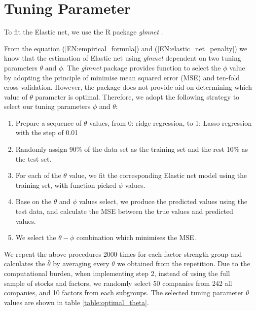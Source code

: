 \section{Tuning Parameter} \label{EN:parameter_tuning }
To fit the Elastic net, we use the R package \textit{glmnet} \cite{Friedman2010, Simon2011}.

From the equation (\ref{EN:empirical_formula}) and (\ref{EN:elastic_net_penalty}) we know that the estimation of Elastic net using \textit{glmnet} dependent on two tuning parameters $\theta$ and $\phi$.
The \textit{glmnet} package provides function to select the $\phi$ value by adopting the principle of minimise mean squared error (MSE) and ten-fold cross-validation.
However, the package does not provide aid on determining which value of $\theta$ parameter is optimal.
Therefore, we adopt the following strategy to select our tuning parameters $\phi$  and $\theta$:
\begin{enumerate}
\item Prepare a sequence of $\theta$ values, from 0: ridge regression, to 1: Lasso regression with the step of 0.01
\item Randomly assign 90\% of the data set as the training set and the rest 10\% as the test set. 
\item For each of the $\theta$ value, we fit the corresponding Elastic net model using the training set, with function picked $\phi$ values.
\item Base on the $\theta$ and $\phi$ values select, we produce the predicted values using the test data, and calculate the MSE between the true values and predicted values.
\item We select the $\theta - \phi$ combination which minimises the MSE.
\end{enumerate}
We repeat the above procedures 2000 times for each factor strength group and
calculates the $\bar{\theta}$ by averaging every $\theta$ we obtained from the repetition.
Due to the computational burden, when implementing step 2, instead of using the full sample of stocks and factors, we randomly select 50 companies from 242 all companies, and 10 factors from each subgroups.
The selected tuning parameter $\theta$ values are shown in table \ref{table:optimal_theta}.
